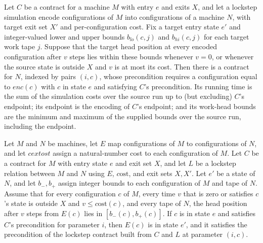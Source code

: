 \begin{definition}
\label{Turing.Contract.lockstep}
\leanok
{}
Let $C$ be a contract for a machine $M$ with entry $e$ and exits $X$, and let a lockstep
simulation encode configurations of $M$ into configurations of a machine $N$, with
target exit set $X'$ and per-configuration cost. Fix a target entry state $e'$ and
integer-valued lower and upper bounds $b_{lo}(c,j)$ and $b_{hi}(c,j)$ for each target
work tape $j$. Suppose that the target head position at every encoded configuration
after $v$ steps lies within these bounds whenever $v=0$, or whenever the source state is
outside $X$ and $v$ is at most its cost. Then there is a contract for $N$, indexed by
pairs $(i,c)$, whose precondition requires a configuration equal to $enc(c)$ with $c$ in
state $e$ and satisfying $C$’s precondition. Its running time is the sum of the
simulation costs over the source run up to (but excluding) $C$’s endpoint; its endpoint
is the encoding of $C$’s endpoint; and its work-head bounds are the minimum and maximum
of the supplied bounds over the source run, including the endpoint.
\end{definition}

\begin{theorem}
\label{Turing.Contract.lockstep_admissible}
\leanok
{}
Let $M$ and $N$ be machines, let $E$ map configurations of $M$ to configurations of $N$,
and let $c	ext{ost}$ assign a natural-number cost to each configuration of $M$. Let $C$
be a contract for $M$ with entry state $e$ and exit set $X$, and let $L$ be a lockstep
relation between $M$ and $N$ using $E$, $c\text{ost}$, and exit sets $X,X'$. Let $e'$ be
a state of $N$, and let $b_-,b_+$ assign integer bounds to each configuration of $M$ and
tape of $N$. Assume that for every configuration $c$ of $M$, every time $v$ that is zero
or satisfies $c$'s state is outside $X$ and $v\le c\text{ost}(c)$, and every tape of
$N$, the head position after $v$ steps from $E(c)$ lies in $[b_-(c),b_+(c)]$. If $c$ is
in state $e$ and satisfies $C$'s precondition for parameter $i$, then $E(c)$ is in state
$e'$, and it satisfies the precondition of the lockstep contract built from $C$ and $L$
at parameter $(i,c)$.
\end{theorem}

